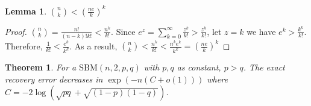 \documentclass{article}
\newtheorem{theorem}{Theorem}
\newtheorem{lemma}{Lemma}
\begin{document}
\begin{lemma}\label{lem:nk}
	$\binom{n}{k} < (\frac{ne}{k})^k$
\end{lemma}
\begin{proof}
	$\binom{n}{k} = \frac{n!}{(n-k)!k!} < \frac{n^k}{k!}$.
	Since $e^z = \sum_{k=0}^{\infty} \frac{z^k}{k!} > \frac{z^k}{k!}$,
	let $z=k$ we have $e^k > \frac{k^k}{k!}$.
	Therefore, $\frac{1}{k!} < \frac{e^k}{k^k}$.
	As a result, $\binom{n}{k}  < \frac{n^k}{k!} < \frac{n^k e^k}{k^k}
	= (\frac{ne}{k})^k$
\end{proof}
\begin{theorem}\label{thm:2pq}
	For a $\textrm{SBM}(n,2,p, q)$ with $p,q$ as constant, $p > q$. The
	exact recovery error decreases in $\exp(-n (C + o(1)))$
	where $C = -2\log(\sqrt{pq} + \sqrt{(1-p)(1-q)})$.
\end{theorem}
\end{document}
